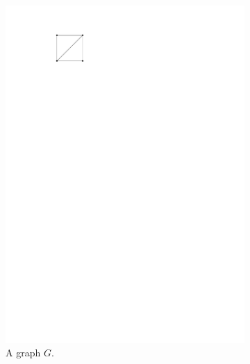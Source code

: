  \begin{figure}
    \centering
      \begin{subfigure}[t]{1.3cm}
        \centering
        \includegraphics[scale=.3]{introduction/img/caGraph.pdf}
        \caption{A graph $G$.}
      \end{subfigure}~
      \begin{subfigure}[t]{3cm}
        \centering

\end{subfigure}
\end{figure}
